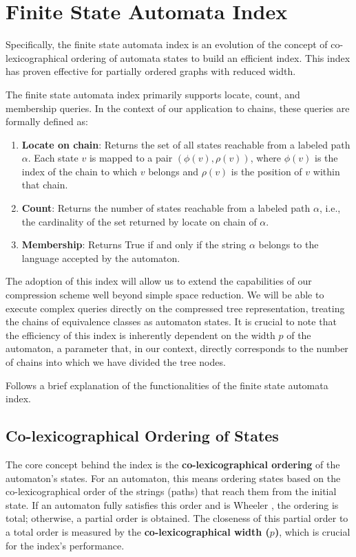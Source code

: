 \section{Finite State Automata Index}
Specifically, the finite state automata index is an evolution of the concept of co-lexicographical ordering of automata states to build an efficient index. This index has proven effective for partially ordered graphs with reduced width.

The finite state automata index primarily supports locate, count, and membership queries. In the context of our application to chains, these queries are formally defined as:

\begin{enumerate}
    \item \textbf{Locate on chain}: Returns the set of all states reachable from a labeled path $\alpha$. Each state $v$ is mapped to a pair $(\phi(v), \rho(v))$, where $\phi(v)$ is the index of the chain to which $v$ belongs and $\rho(v)$ is the position of $v$ within that chain.
    \item \textbf{Count}: Returns the number of states reachable from a labeled path $\alpha$, i.e., the cardinality of the set returned by locate on chain of $\alpha$.
    \item \textbf{Membership}: Returns True if and only if the string $\alpha$ belongs to the language accepted by the automaton.
\end{enumerate}

The adoption of this index will allow us to extend the capabilities of our compression scheme well beyond simple space reduction. We will be able to execute complex queries directly on the compressed tree representation, treating the chains of equivalence classes as automaton states. It is crucial to note that the efficiency of this index is inherently dependent on the width $p$ of the automaton, a parameter that, in our context, directly corresponds to the number of chains into which we have divided the tree nodes.

Follows a brief explanation of the functionalities of the finite state automata index.

\subsection{Co-lexicographical Ordering of States}
The core concept behind the index is the \textbf{co-lexicographical ordering} of the automaton's states. For an automaton, this means ordering states based on the co-lexicographical order of the strings (paths) that reach them from the initial state. If an automaton fully satisfies this order and is Wheeler \cite{gagie2017wheeler}, the ordering is total; otherwise, a partial order is obtained. The closeness of this partial order to a total order is measured by the \textbf{co-lexicographical width ($p$)}, which is crucial for the index's performance.

